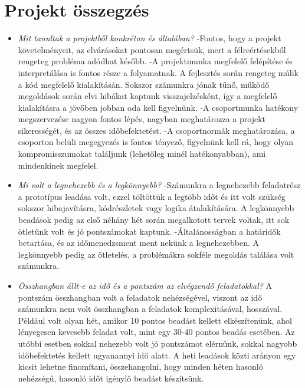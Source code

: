 \section{Projekt összegzés}
\begin{itemize}
\item \textit{Mit tanultak a projektből konkrétan és általában?} \newline
    -Fontos, hogy a projekt követelményeit, az elvárásokat pontosan megértsük, mert a félreértésekből rengeteg probléma adódhat később. 
    -A projektmunka megfelelő felépítése és interpretálása is fontos része a folyamatnak. A fejlesztés során rengeteg múlik a kód megfelelő kialakításán. Sokszor számunkra jónak tűnő, működő megoldások során elvi hibákat kaptunk visszajelzésként, így a megfelelő kialakításra a jövőben jobban oda kell figyelnünk. 
    -A csoportmunka hatékony megszervezése nagyon fontos lépés, nagyban meghatározza a projekt sikerességét, és az összes időbefektetést. 
    -A csoportnormák meghatározása, a csoporton belüli megegyezés is fontos tényező, figyelnünk kell rá, hogy olyan kompromisszumokat találjunk (lehetőleg minél hatékonyabban), ami mindenkinek megfelel.  
\item \textit{Mi volt a legnehezebb és a legkönnyebb?} \newline
    -Számunkra a legnehezebb feladatrész a prototípus leadása volt, ezzel töltöttük a legtöbb időt és itt volt szükség sokszor hibajavításra, kódrészletek vagy logika átalakítására. A legkönnyebb beadások pedig az első néhány hét során megalkotott tervek voltak, itt sok ötletünk volt és jó pontszámokat kaptunk. 
    -Általánosságban a határidők betartása, és az időmenedzsment ment nekünk a legnehezebben. A legkönnyebb pedig az ötletelés, a problémákra sokféle megoldás találása volt számunkra.
\item \textit{Összhangban állt-e az idő és a pontszám az elvégzendő feladatokkal?} \newline
    A pontszám összhangban volt a feladatok nehézségével, viszont az idő számunkra nem volt összhangban a feladatok komplexitásával, hosszával. Például volt olyan hét, amikor 10 pontos beadást kellett elkészítenünk, ahol lényegesen kevesebb feladat volt, mint egy 30-40 pontos beadás esetében. Az utóbbi esetben sokkal nehezebb volt jó pontszámot elérnünk, sokkal nagyobb időbefektetés kellett ugyanannyi idő alatt. A heti leadások közti arányon egy kicsit lehetne finomítani, összehangolni, hogy minden héten hasonló nehézségű, hasonló időt igénylő beadást készítsünk. 

\end{itemize}
